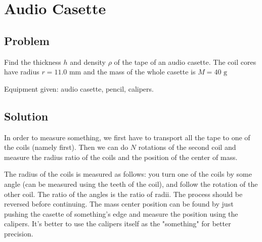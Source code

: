\section*{Audio Casette}

\subsection*{Problem}

Find the thickness $h$ and density $\rho$ of the tape of an audio casette.
The coil cores have radius $r = 11.0\text{ mm}$ and
the mass of the whole casette is $M = 40\text{ g}$

Equipment given: audio casette, pencil, calipers.

\subsection*{Solution}

In order to measure something,
we first have to transport all the tape to one of the coils (namely first).
Then we can do $N$ rotations of the second coil and measure
the radius ratio of the coils and the position of the center of mass.

The radius of the coils is measured as follows:
you turn one of the coils by some angle
(can be measured using the teeth of the coil),
and follow the rotation of the other coil.
The ratio of the angles is the ratio of radii.
The process should be reversed before continuing.
The mass center position can be found
by just pushing the casette of something's edge
and measure the position using the calipers.
It's better to use the calipers itself as the "something"
for better precision.


